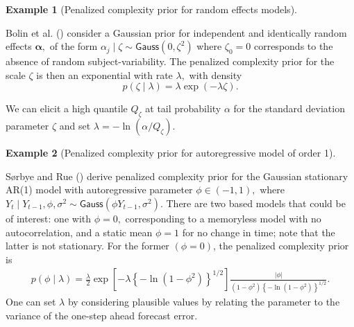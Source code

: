 \documentclass[
  11pt,
  letterpaper,
]{scrbook}
\theoremstyle{definition}
\newtheorem{example}{Example}[chapter]
\theoremstyle{plain}
\theoremstyle{plain}
\theoremstyle{plain}
\theoremstyle{definition}
\theoremstyle{definition}
\theoremstyle{plain}
\theoremstyle{plain}
\theoremstyle{remark}
\begin{document}
\begin{example}[Penalized complexity prior for random effects
models]\protect\hypertarget{exm-pcprior-randomeffect}{}\label{exm-pcprior-randomeffect}

Bolin et al. () consider a Gaussian prior
for independent and identically random effects \(\boldsymbol{\alpha},\)
of the form \(\alpha_j \mid \zeta \sim \mathsf{Gauss}(0, \zeta^2)\)
where \(\zeta_0=0\) corresponds to the absence of random
subject-variability. The penalized complexity prior for the scale
\(\zeta\) is then an exponential with rate \(\lambda,\) with density
\[p(\zeta \mid \lambda) = \lambda \exp(-\lambda \zeta).\]

We can elicit a high quantile \(Q_\zeta\) at tail probability \(\alpha\)
for the standard deviation parameter \(\zeta\) and set
\(\lambda = -\ln(\alpha/Q_\zeta)\).

\end{example}

\begin{example}[Penalized complexity prior for autoregressive model of
order
1]\protect\hypertarget{exm-pcprior-arorder}{}\label{exm-pcprior-arorder}

Sørbye and Rue () derive
penalized complexity prior for the Gaussian stationary AR(1) model with
autoregressive parameter \(\phi \in (-1,1),\) where
\(Y_t \mid Y_{t-1}, \phi, \sigma^2 \sim \mathsf{Gauss}(\phi Y_{t-1}, \sigma^2).\)
There are two based models that could be of interest: one with
\(\phi=0,\) corresponding to a memoryless model with no autocorrelation,
and a static mean \(\phi=1\) for no change in time; note that the latter
is not stationary. For the former \((\phi=0)\), the penalized complexity
prior is \begin{align*}
p(\phi \mid \lambda) = \frac{\lambda}{2} \exp\left[-\lambda \left\{-\ln(1-\phi^2)\right\}^{1/2}\right] \frac{|\phi|}{(1-\phi^2)\left\{-\ln(1-\phi^2)\right\}^{1/2}}.
\end{align*} One can set \(\lambda\) by considering plausible values by
relating the parameter to the variance of the one-step ahead forecast
error.

\end{example}
\end{document}
